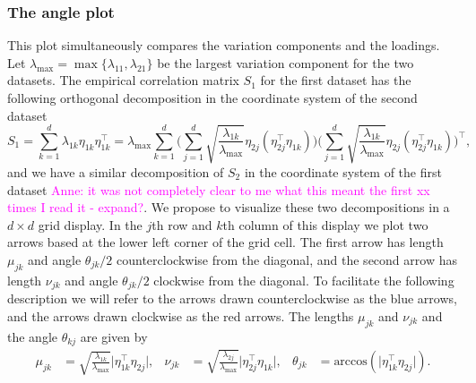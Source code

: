 \documentclass[titlepage,11pt,twoside]{article}
\newcommand{\hl}[1]{\textcolor{magenta}{#1}}
\newcommand{\acos}{\text{arccos}}
\begin{document}
\subsubsection{The angle plot}
This plot simultaneously compares the variation components and the loadings. Let $\lambda_{\max} = \max\{ \lambda_{11}, \lambda_{21} \}$ be the largest variation component for the two datasets. The empirical correlation matrix $S_1$ for the first dataset has the following orthogonal decomposition in the coordinate system of the second dataset
\begin{equation*}
S_1 = \sum_{k=1}^d \lambda_{1k} \eta_{1k} \eta_{1k}^\top
= \lambda_{\max} \sum_{k=1}^d
\Bigg( \sum_{j=1}^d \sqrt{\frac{\lambda_{1k}}{\lambda_{\max}}} \eta_{2j} (\eta_{2j}^\top \eta_{1k}) \Bigg)
\Bigg( \sum_{j=1}^d \sqrt{\frac{\lambda_{1k}}{\lambda_{\max}}} \eta_{2j} (\eta_{2j}^\top \eta_{1k}) \Bigg)^\top,
\end{equation*}
and we have a similar decomposition of $S_2$ in the coordinate system of the first dataset \hl{Anne: it was not completely clear to me what this meant the first xx times I read it - expand?}. We propose to visualize these two decompositions in a $d \times d$ grid display. In the $j$th row and $k$th column of this display we plot two arrows based at the lower left corner of the grid cell. The first arrow has length $\mu_{jk}$ and angle $\theta_{jk}/2$ counterclockwise from the diagonal, and the second arrow has length $\nu_{jk}$ and angle $\theta_{jk}/2$ clockwise from the diagonal. To facilitate the following description we will refer to the arrows drawn counterclockwise as the blue arrows, and the arrows drawn clockwise as the red arrows. The lengths $\mu_{jk}$ and $\nu_{jk}$ and the angle $\theta_{kj}$ are given by
\begin{align*}
\mu_{jk} &= \sqrt{\frac{\lambda_{1k}}{\lambda_{\max}}} \lvert \eta_{1k}^\top \eta_{2j} \rvert, &
\nu_{jk} &= \sqrt{\frac{\lambda_{2j}}{\lambda_{\max}}} \lvert \eta_{2j}^\top \eta_{1k} \rvert, &
\theta_{jk} &= \acos(\lvert \eta_{1k}^\top \eta_{2j} \rvert).
\end{align*}
\end{document}
